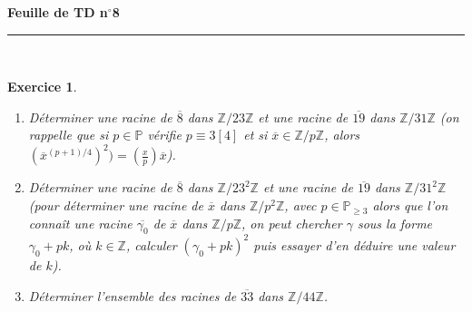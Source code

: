 \documentclass[11pt,a4paper]{article}
\title{}
\date{}
\newtheorem{ex}{Exercice}
\newcommand{\HRule}{\rule{\linewidth}{0.5mm}}
\begin{document}
\pagestyle{fancy}

\fancyhead{}
 \fancyfoot{}


\newcommand{\lb}{\llbracket}
\newcommand{\rb}{\rrbracket}

\newcommand{\nmd}[3]{#1 \not \equiv #2 \! \! \! \! \!  \pmod #3 }
\newcommand{\mda}[3]{#1 \equiv #2 \! \!  \pmod #3 }
\newcommand{\nmda}[3]{#1 \not \equiv #2 \! \! \pmod #3 }
\newcommand{\mo}[2]{#1 \! \! \! \! \! \pmod #2 }
\newcommand{\N}{\mathbb{N}}
\newcommand{\Z}{\mathbb{Z}}
\newcommand{\md}{\mathrm{\ mod\ }}


\thispagestyle{fancy}

\begin{center}
    { \huge \bfseries
    Feuille de TD n$^{\boldsymbol{\circ}}$8
     \\ [0cm] }
    \HRule \\[0.5cm]
\end{center}


\begin{ex}\label{exRacines_carrées}
\begin{enumerate}
\item Déterminer une racine de $\overline{8}$ dans $\Z/23\Z$ et une racine de $\overline{19}$ dans $\Z/31\Z$ (on rappelle que si $p\in \mathbb{P}$ vérifie $p\equiv 3[4]$ et si $\overline{x}\in \Z/p\Z$, alors $(\overline{x}^{(p+1)/4})^2)=\left(\frac{x}{p}\right) \overline{x}$).

\item Déterminer une racine de $\overline{8}$ dans $\Z/23^2\Z$ et une racine de $\overline{19}$ dans $\Z/31^2\Z$ (pour déterminer une racine de $\overline{x}$ dans $\Z/p^2\Z$, avec $p\in \mathbb{P}_{\geq 3}$ alors que l'on connaît une racine  $\overline{\gamma_0}$ de $\overline{x}$ dans $\Z/p\Z$, on peut chercher $\gamma$ sous la forme $\gamma_0+pk$, où $k\in \Z$, calculer $(\gamma_0+pk)^2$ puis essayer d'en déduire une valeur de $k$).

\item Déterminer l'ensemble des  racines de $\overline{33}$ dans $\Z/44\Z$.
\end{enumerate}
\end{ex}
\end{document}
